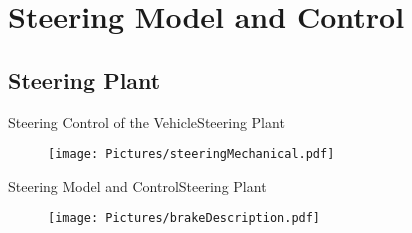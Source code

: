 \section{Steering Model and Control}

\subsection{Steering Plant}
\begin{frame}{Steering Control of the Vehicle}{Steering Plant}

    \begin{figure}[H]
    \centering
    \texttt{[image: Pictures/steeringMechanical.pdf]}
  \end{figure}  
\end{frame}
\begin{frame}{Steering Model and Control}{Steering Plant}

    \begin{figure}[H]
    \centering
    \texttt{[image: Pictures/brakeDescription.pdf]}
  \end{figure}  
\end{frame} 

